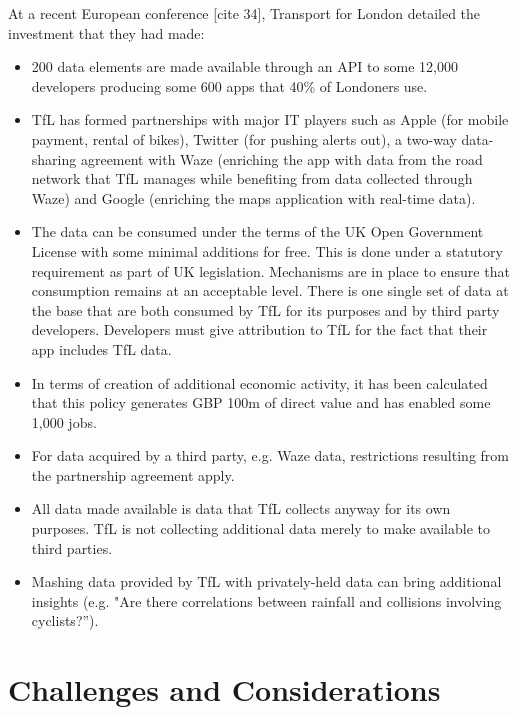 At a recent European conference [cite 34], Transport for London detailed the investment
that they had made:
\begin{itemize}
	\item 200 data elements are made available through an API to some 12,000
	developers producing some 600 apps that 40\% of Londoners use.
	
	\item TfL has formed partnerships with major IT players such as Apple
	(for mobile payment, rental of bikes), Twitter (for pushing alerts out),
	a two-way data-sharing agreement with Waze (enriching the app with data
	from the road network that TfL manages while benefiting from data collected
	through Waze) and Google (enriching the maps application with real-time data).
	
	\item The data can be consumed under the terms of the UK Open Government
	License with some minimal additions for free. This is done under a statutory
	requirement as part of UK legislation. Mechanisms are in place to ensure that
	consumption remains at an acceptable level. There is one single set of data
	at the base that are both consumed by TfL for its purposes and by third	party
	developers. Developers must give attribution to TfL for the fact that their
	app includes TfL data.
	
	\item In terms of creation of additional economic activity, it has been
	calculated that this policy	generates GBP 100m of direct value and has enabled
	some 1,000 jobs.
	
	\item For data acquired by a third party, e.g. Waze data, restrictions resulting
	from the partnership agreement apply.
	
	\item All data made available is data that TfL collects anyway for its own
	purposes. TfL is not collecting additional data merely to make available to
	third parties.
	
	\item Mashing data provided by TfL with privately-held data can bring additional
	insights (e.g. "Are	there correlations between rainfall and collisions involving cyclists?”).
\end{itemize}

\section{Challenges and Considerations}

